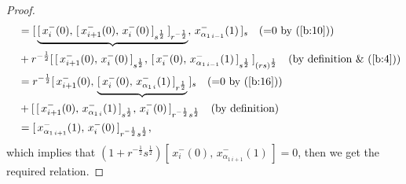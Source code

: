 \documentclass{amsproc}
\theoremstyle{remark}
\numberwithin{equation}{section}
\begin{document}
\begin{proof}
\begin{eqnarray*}
\begin{split}
&\quad=[\,\underbrace{[\,x_i^-(0),\,[\,x_{i+1}^-(0),\,x_i^-(0)\,]_{s^{\frac{1}{2}}}
\,]_{r^{-\frac{1}{2}}}}
,\,x_{\alpha_{1\,i-1}}^-(1)\,]_{s}\quad {\hbox{(=0 by (\ref{b:10}))}}\\
&\quad+r^{-\frac{1}{2}}[\,[\,x_{i+1}^-(0),\,x_i^-(0)\,]_{s^{\frac{1}{2}}}
,\,[\,x_{i}^-(0),\,x_{\alpha_{1\,i-1}}^-(1)\,]_{s^{\frac{1}{2}}}
\,]_{(rs)^{\frac{1}{2}}}\quad {\hbox{(by definition \& (\ref{b:4}))}}\\
&\quad=r^{-\frac{1}{2}}[\,x_{i+1}^-(0),\,
\underbrace{[\,x_i^-(0),\,x_{\alpha_{1\,i}}^-(1)\,]_{r^{\frac{1}{2}}}}
\,]_{s}\quad {\hbox{(=0 by (\ref{b:16}))}}\\
&\quad+[\,[\,x_{i+1}^-(0),\,x_{\alpha_{1\,i}}^-(1)\,]_{s^{\frac{1}{2}}}
,\,x_{i}^-(0)\,]_{r^{-\frac{1}{2}}s^{\frac{1}{2}}}
\quad {\hbox{(by definition)}}\\
&\quad=[\,x_{\alpha_{1\,i+1}}^-(1),\,x_{i}^-(0)\,]_{r^{-\frac{1}{2}}s^{\frac{1}{2}}},
\end{split}
\end{eqnarray*}
which implies that
$(1+r^{-\frac{1}{2}}s^{\frac{1}{2}})[\,x_i^-(0),\,
x_{\alpha_{1\,i+1}}^-(1)\,]=0$, then we get the required relation.
\end{proof}
\end{document}
